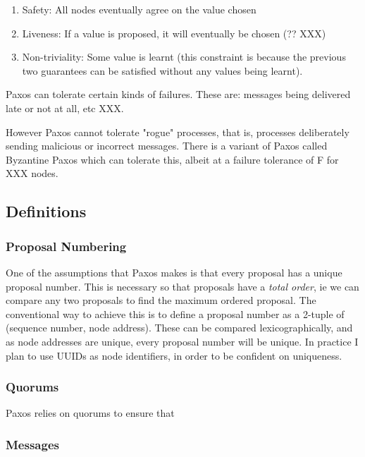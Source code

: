 \documentclass[12pt,twoside,notitlepage]{report}
\begin{document}
\begin{enumerate}
	\item Safety: All nodes eventually agree on the value chosen
	\item Liveness: If a value is proposed, it will eventually be chosen (?? XXX)
	\item Non-triviality: Some value is learnt (this constraint is because the previous two guarantees can
be satisfied without any values being learnt).
\end{enumerate}

Paxos can tolerate certain kinds of failures. These are: messages being delivered late or not at
all, etc XXX.

However Paxos cannot tolerate "rogue" processes, that is, processes deliberately sending malicious
or incorrect messages. There is a variant of Paxos called Byzantine Paxos which can tolerate this,
albeit at a failure tolerance of F for XXX nodes.


\subsection{Definitions}

\subsubsection*{Proposal Numbering}

One of the assumptions that Paxos makes is that every proposal has a unique proposal number. This
is necessary so that proposals have a \emph{total order}, ie we can compare any two proposals to
find the maximum ordered proposal. The conventional way to achieve this is to define a proposal
number as a 2-tuple of (sequence number, node address). These can be compared lexicographically,
and as node addresses are unique, every proposal number will be unique. In practice I plan to use
UUIDs as node identifiers, in order to be confident on uniqueness.

\subsubsection*{Quorums}

Paxos relies on quorums to ensure that 

\subsubsection*{Messages}
\end{document}
